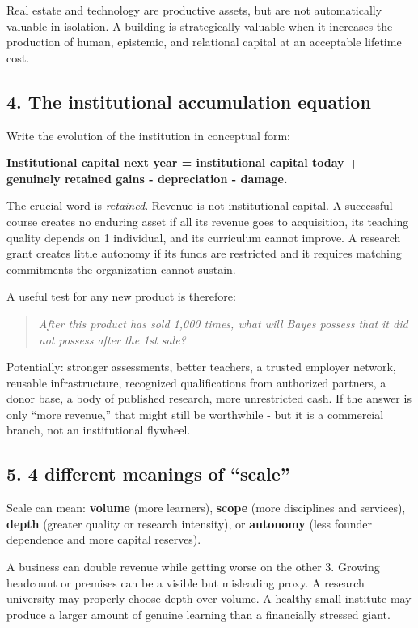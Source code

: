Real estate and technology are productive assets, but are not automatically valuable in isolation. A building is strategically valuable when it increases the production of human, epistemic, and relational capital at an acceptable lifetime cost.

\subsection{4. The institutional accumulation equation}

Write the evolution of the institution in conceptual form:

\textbf{Institutional capital next year = institutional capital today + genuinely retained gains - depreciation - damage.}

The crucial word is \textit{retained}. Revenue is not institutional capital. A successful course creates no enduring asset if all its revenue goes to acquisition, its teaching quality depends on 1 individual, and its curriculum cannot improve. A research grant creates little autonomy if its funds are restricted and it requires matching commitments the organization cannot sustain.

A useful test for any new product is therefore:

\begin{quote}\itshape
After this product has sold 1,000 times, what will Bayes possess that it did not possess after the 1st sale?
\end{quote}
Potentially: stronger assessments, better teachers, a trusted employer network, reusable infrastructure, recognized qualifications from authorized partners, a donor base, a body of published research, more unrestricted cash. If the answer is only ``more revenue,'' that might still be worthwhile - but it is a commercial branch, not an institutional flywheel.

\subsection{5. 4 different meanings of ``scale''}

Scale can mean: \textbf{volume} (more learners), \textbf{scope} (more disciplines and services), \textbf{depth} (greater quality or research intensity), or \textbf{autonomy} (less founder dependence and more capital reserves).

A business can double revenue while getting worse on the other 3. Growing headcount or premises can be a visible but misleading proxy. A research university may properly choose depth over volume. A healthy small institute may produce a larger amount of genuine learning than a financially stressed giant.


